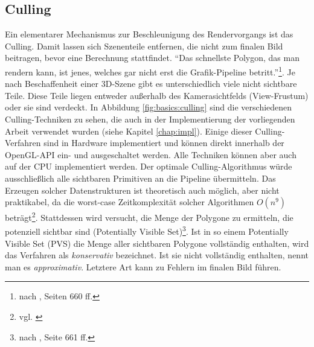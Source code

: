 \subsection{Culling}
\label{sec:basics:algos:culling}
Ein elementarer Mechanismus zur Beschleunigung des Rendervorgangs ist das Culling. Damit lassen sich Szenenteile entfernen, die nicht zum finalen Bild beitragen, bevor eine Berechnung stattfindet. "`Das schnellste Polygon, das man rendern kann, ist jenes, welches gar nicht erst die Grafik-Pipeline betritt."'\footnote{nach \cite{RTR3}, Seiten 660 ff.}. Je nach Beschaffenheit einer 3D-Szene gibt es unterschiedlich viele nicht sichtbare Teile. Diese Teile liegen entweder außerhalb des Kamerasichtfelds (View-Frustum) oder sie sind verdeckt. In Abbildung \ref{fig:basics:culling} sind die verschiedenen Culling-Techniken zu sehen, die auch in der Implementierung der vorliegenden Arbeit verwendet wurden (siehe Kapitel \ref{chap:impl}).
Einige dieser Culling-Verfahren sind in Hardware implementiert und können direkt innerhalb der OpenGL-API ein- und ausgeschaltet werden. Alle Techniken können aber auch auf der CPU implementiert werden. Der optimale Culling-Algorithmus würde ausschließlich alle sichtbaren Primitiven an die Pipeline übermitteln. Das Erzeugen solcher Datenstrukturen ist theoretisch auch möglich, aber nicht praktikabel, da die worst-case Zeitkomplexität solcher Algorithmen $O(n^{9})$ beträgt\footnote{vgl. \cite{culling}}. Stattdessen wird versucht, die Menge der Polygone zu ermitteln, die potenziell sichtbar sind (Potentially Visible Set)\footnote{nach \cite{RTR3}, Seite 661 ff.}. Ist in so einem Potentially Visible Set (PVS) die Menge aller sichtbaren Polygone vollständig enthalten, wird das Verfahren als \textit{konservativ} bezeichnet. Ist sie nicht vollständig enthalten, nennt man es \textit{approximativ}. Letztere Art kann zu Fehlern im finalen Bild führen.

